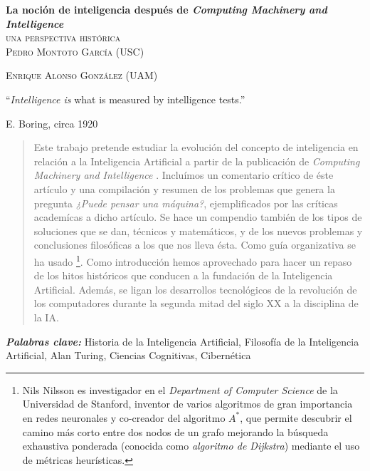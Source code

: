 \documentclass[12pt]{memoir}
\makeatletter
\newlength\drop
\newcommand*\titleM{\begingroup%
\setlength\drop{0.08\textheight}
\centering
\vspace*{\drop}
{\Huge\bfseries La noción de inteligencia después de \textit{Computing Machinery and Intelligence}}\\[\baselineskip]
{\scshape una perspectiva histórica}\\[\baselineskip]
\vfill
{\large\scshape Pedro Montoto García (USC)}\par
{\large\scshape Enrique Alonso González (UAM)}\par
\vfill
{\scshape \@date}\par
\vspace*{2\drop}
\endgroup}
\providecommand{\keywords}[2]{
	\textbf{\textit{#1: }} #2
}
\makeatother
\begin{document}
\pagestyle{empty}




\begin{titlingpage}
\titleM
\end{titlingpage}

\OnehalfSpacing



\setlength{\epigraphwidth}{0.8\textwidth}
\thispagestyle{empty}
\epigraph{``\textit{Intelligence is} what is measured by intelligence tests.''}{E. Boring, circa 1920}
\newpage


\thispagestyle{empty}
\begin{abstract}
	Este trabajo pretende estudiar la evolución del concepto de inteligencia en relación a la Inteligencia Artificial a partir de la publicación de \textit{Computing Machinery and Intelligence} \parencite{Turing1950cmi}. Incluímos un comentario crítico de éste artículo y una compilación y resumen de los problemas que genera la pregunta \textit{¿Puede pensar una máquina?}, ejemplificados por las críticas academícas a dicho artículo. Se hace un compendio también de los tipos de soluciones que se dan, técnicos y matemáticos, y de los nuevos problemas y conclusiones filosóficas a los que nos lleva ésta. Como guía organizativa se ha usado  \parencite{Nilsson2009}\footnote{Nils Nilsson es investigador en el \textit{Department of Computer Science} de la Universidad de Stanford, inventor de varios algoritmos de gran importancia en redes neuronales y co-creador del algoritmo $A^*$, que permite descubrir el camino más corto entre dos nodos de un grafo mejorando la búsqueda exhaustiva ponderada (conocida como \textit{algoritmo de Dijkstra}) mediante el uso de métricas heurísticas.}. Como introducción hemos aprovechado para hacer un repaso de los hitos históricos que conducen a la fundación de la Inteligencia Artificial. Además, se ligan los desarrollos tecnológicos de la revolución de los computadores durante la segunda mitad del siglo XX a la disciplina de la IA.
\end{abstract}

\keywords{Palabras clave}{Historia de la Inteligencia Artificial, Filosofía de la Inteligencia Artificial, Alan Turing, Ciencias Cognitivas, Cibernética}
\end{document}
